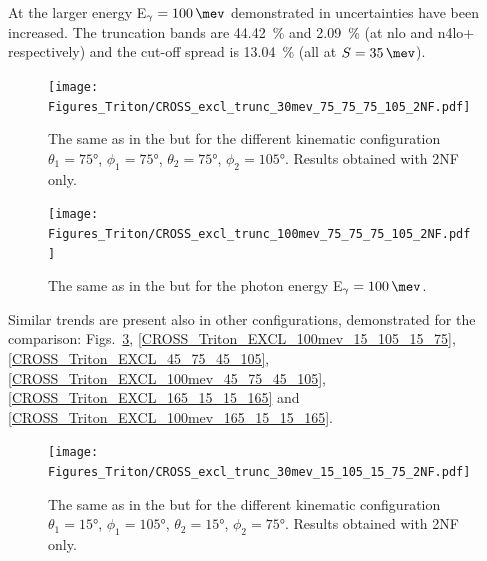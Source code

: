     At the larger energy E$_\gamma=\SI{100}{\mev}$ demonstrated in 
    uncertainties have been increased. The truncation bands are \SI{44.42}{\percent} and 
    \SI{2.09}{\percent} (at \gls{nlo} and \gls{n4lo+} respectively) and
    the cut-off spread is \SI{13.04}{\percent} (all at $S=\SI{35}{\mev}$).


    \begin{figure}[h]
        \begin{center}
            \texttt{[image: Figures\_Triton/CROSS\_excl\_trunc\_30mev\_75\_75\_75\_105\_2NF.pdf]}
            \end{center}
            \caption{The same as in the  but for the different kinematic
            configuration
            $\theta_1 = \ang{75}$, $\phi_1 = \ang{75}$,
            $\theta_2 = \ang{75}$, $\phi_2 = \ang{105}$.
            Results obtained with 2NF only.}
            \label{CROSS_Triton_EXCL_75_75_75_105}
    \end{figure}


    \begin{figure}[h]
        \begin{center}
            \texttt{[image: Figures\_Triton/CROSS\_excl\_trunc\_100mev\_75\_75\_75\_105\_2NF.pdf]}
            \end{center}
            \caption{The same as in the  but for the photon energy
            E$_\gamma = \SI{100}{\mev}$.}
            \label{CROSS_Triton_EXCL_100mev_75_75_75_105}
    \end{figure}

    Similar trends are present also in other configurations, demonstrated for the comparison:
    Figs.~\ref{CROSS_Triton_EXCL_15_105_15_75},
    \ref{CROSS_Triton_EXCL_100mev_15_105_15_75},
    \ref{CROSS_Triton_EXCL_45_75_45_105},
    \ref{CROSS_Triton_EXCL_100mev_45_75_45_105},
    \ref{CROSS_Triton_EXCL_165_15_15_165}
    and
    \ref{CROSS_Triton_EXCL_100mev_165_15_15_165}.

    \begin{figure}[h]
        \begin{center}
            \texttt{[image: Figures\_Triton/CROSS\_excl\_trunc\_30mev\_15\_105\_15\_75\_2NF.pdf]}
            \end{center}
            \caption{The same as in the  but for the different kinematic
            configuration
            $\theta_1 = \ang{15}$, $\phi_1 = \ang{105}$,
            $\theta_2 = \ang{15}$, $\phi_2 = \ang{75}$.
            Results obtained with 2NF only.}
            \label{CROSS_Triton_EXCL_15_105_15_75}
    \end{figure}


